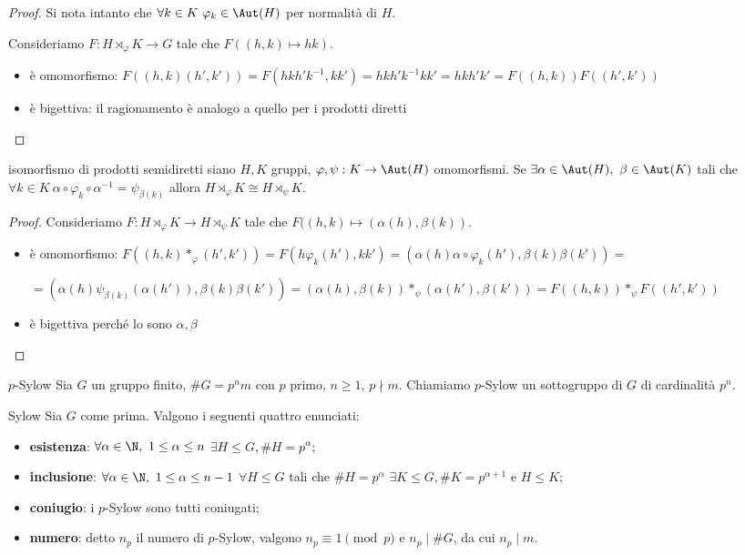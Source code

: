 \begin{proof}
    Si nota intanto che $\forall k \in K \ \varphi_k \in \Aut(H)$ per normalità di $H$.
    
    Consideriamo $F: H \rtimes_{\varphi} K \rightarrow G$ tale che $F((h,k) \mapsto hk)$.
    \begin{itemize}
        \item è omomorfismo: $F((h,k)(h',k')) = F(hkh'k^{-1},kk') = hkh'k^{-1}kk' = hkh'k' = F((h,k))F((h',k'))$
        \item è bigettiva: il ragionamento è analogo a quello per i prodotti diretti
    \end{itemize}
\end{proof}
\begin{proposition}{isomorfismo di prodotti semidiretti}
    siano $H,K$ gruppi, $\varphi, \psi: K \rightarrow \Aut(H)$ omomorfismi. Se $\exists \alpha \in \Aut(H), \ \beta \in \Aut(K)$ tali che $\forall k \in K \ \alpha \circ \varphi_k \circ \alpha^{-1} = \psi_{\beta(k)}$ allora $H \rtimes_{\varphi} K \cong  H \rtimes_{\psi} K$.
\end{proposition}
\begin{proof}
    Consideriamo $F: H \rtimes_{\varphi} K \to  H \rtimes_{\psi} K$ tale che $F((h,k) \mapsto (\alpha(h), \beta(k))$.
    \begin{itemize}
        \item è omomorfismo: $F((h,k)*_{\varphi}(h',k')) = F(h\varphi_{k}(h'),kk') =  (\alpha(h)\alpha\circ\varphi_{k}(h'),\beta(k)\beta(k')) =$
        
        $= (\alpha(h)\psi_{\beta(k)}(\alpha(h')),\beta(k)\beta(k')) =(\alpha(h), \beta(k))*_{\psi} (\alpha(h'),\beta(k')) =  F((h,k))*_{\psi}F((h',k'))$
        \item è bigettiva perché lo sono $\alpha, \beta$
    \end{itemize}
\end{proof}
\begin{definition}{$p$-Sylow}
    Sia $G$ un gruppo finito, $\#G = p^n m$ con $p$ primo, $n \geq 1$, $p \nmid m$. Chiamiamo $p$-Sylow un sottogruppo di $G$ di cardinalità $p^n$.
\end{definition}
\begin{theorem}{Sylow}
    Sia $G$ come prima. Valgono i seguenti quattro enunciati:
    \begin{itemize}
        \item \textbf{esistenza}: $\forall \alpha \in \N, \ 1 \leq \alpha \leq n$ $\exists  H \leq G, \#H = p^{\alpha}$;
        \item \textbf{inclusione}: $\forall \alpha \in \N, \ 1 \leq \alpha \leq n-1$ $\forall  H \leq G$ tali che $\#H = p^{\alpha}$ $\exists  K \leq G, \#K = p^{\alpha+1}$ e $ H \leq K$;
        \item \textbf{coniugio}: i $p$-Sylow sono tutti coniugati;
        \item \textbf{numero}: detto $n_p$ il numero di $p$-Sylow, valgono $n_p \equiv 1 \pmod{p}$ e $n_p \mid \#G$, da cui $n_p \mid m$.
    \end{itemize}
\end{theorem}

